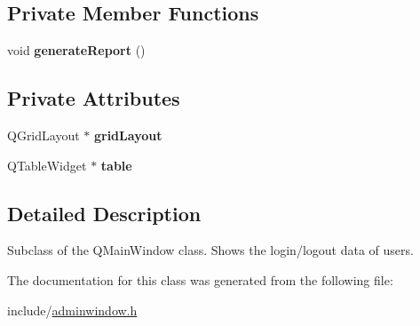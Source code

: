 \subsection*{Private Member Functions}
\begin{DoxyCompactItemize}
\item 
\mbox{\label{classAdminWindow_ada035e95b5a80f21fe65cefa4c2a6d2f}} 
void {\bfseries generate\+Report} ()
\end{DoxyCompactItemize}
\subsection*{Private Attributes}
\begin{DoxyCompactItemize}
\item 
\mbox{\label{classAdminWindow_afcf9cc1adbf5f515d342b434a5606037}} 
Q\+Grid\+Layout $\ast$ {\bfseries grid\+Layout}
\item 
\mbox{\label{classAdminWindow_aa7e56cebeaeca9a3d9cf05df2f1c0f3f}} 
Q\+Table\+Widget $\ast$ {\bfseries table}
\end{DoxyCompactItemize}


\subsection{Detailed Description}
Subclass of the Q\+Main\+Window class. Shows the login/logout data of users. 

The documentation for this class was generated from the following file\+:\begin{DoxyCompactItemize}
\item 
include/\hyperlink{adminwindow_8h}{adminwindow.\+h}\end{DoxyCompactItemize}
